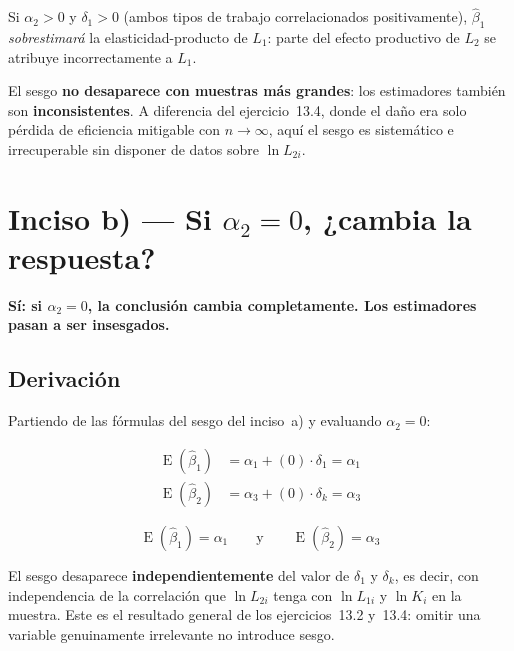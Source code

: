 \documentclass[12pt, letterpaper]{article}
\newcommand{\E}{\operatorname{E}}
\begin{document}
Si $\alpha_2 > 0$ y $\delta_1 > 0$ (ambos tipos de trabajo correlacionados
positivamente), $\hat{\beta}_1$ \textit{sobrestimará} la elasticidad-producto
de $L_1$: parte del efecto productivo de $L_2$ se atribuye incorrectamente
a $L_1$.

\begin{clave}
  El sesgo \textbf{no desaparece con muestras más grandes}: los estimadores
  también son \textbf{inconsistentes}. A diferencia del ejercicio~13.4,
  donde el daño era solo pérdida de eficiencia mitigable con $n \to \infty$,
  aquí el sesgo es sistemático e irrecuperable sin disponer de datos sobre
  $\ln L_{2i}$.
\end{clave}

\section{Inciso b) --- Si \texorpdfstring{$\alpha_2 = 0$}{alpha2 = 0},
  ¿cambia la respuesta?}

\textbf{Sí: si $\alpha_2 = 0$, la conclusión cambia completamente. Los
estimadores pasan a ser insesgados.}

\subsection{Derivación}

Partiendo de las fórmulas del sesgo del inciso~a) y evaluando $\alpha_2 = 0$:

\begin{align}
  \E(\hat{\beta}_1) &= \alpha_1 + (0)\cdot\delta_1 = \alpha_1 \\[4pt]
  \E(\hat{\beta}_2) &= \alpha_3 + (0)\cdot\delta_k = \alpha_3
\end{align}

\begin{equation}
  \boxed{
    \E(\hat{\beta}_1) = \alpha_1 \qquad \text{y} \qquad
    \E(\hat{\beta}_2) = \alpha_3
  }
\end{equation}

El sesgo desaparece \textbf{independientemente} del valor de $\delta_1$ y
$\delta_k$, es decir, con independencia de la correlación que $\ln L_{2i}$
tenga con $\ln L_{1i}$ y $\ln K_i$ en la muestra. Este es el resultado
general de los ejercicios~13.2 y~13.4: omitir una variable genuinamente
irrelevante no introduce sesgo.
\end{document}
